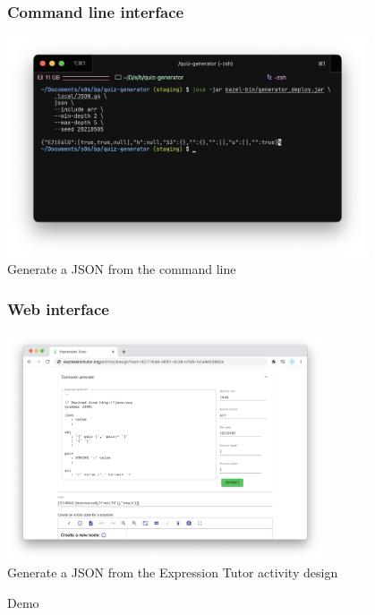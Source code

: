 \documentclass[t,aspectratio=1610]{beamer}
\begin{document}
\begin{frame}
\frametitle{Command line interface}
\begin{center}
	\includegraphics[width=0.8\textwidth]{img/cli} \\
	{Generate a JSON from the command line}
\end{center}
\end{frame}

\begin{frame}
\frametitle{Web interface}
\begin{center}
	\includegraphics[width=0.7\textwidth]{img/web} \\
	{Generate a JSON from the Expression Tutor activity design}
\end{center}
\end{frame}

\begin{frame}[c]{ }
\centering
\Huge Demo
\end{frame}
\end{document}
